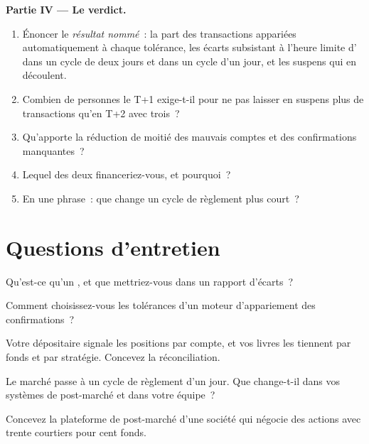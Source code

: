 \begin{problem}
\medskip\noindent\textbf{Partie IV --- Le verdict.}
\begin{enumerate}[resume]
\item Énoncer le \emph{résultat nommé}~: la part des transactions appariées automatiquement à chaque tolérance, les écarts subsistant à l'heure limite d'
dans un cycle de deux jours et dans un cycle d'un jour, et les suspens qui en découlent.
\item Combien de personnes le T+1 exige-t-il pour ne pas laisser en suspens plus de transactions qu'en T+2 avec trois~?
\item Qu'apporte la réduction de moitié des mauvais comptes et des confirmations manquantes~?
\item Lequel des deux financeriez-vous, et pourquoi~?
\item En une phrase~: que change un cycle de règlement plus court~?
\end{enumerate}
\end{problem}

\section{Questions d'entretien}

\begin{interviewq}\label{iq:pl:post-trade-systems:1}
Qu'est-ce qu'un , et que mettriez-vous dans un rapport d'écarts~?
\end{interviewq}

\begin{interviewq}\label{iq:pl:post-trade-systems:2}
Comment choisissez-vous les tolérances d'un moteur d'appariement des confirmations~?
\end{interviewq}

\begin{interviewq}\label{iq:pl:post-trade-systems:3}
Votre dépositaire signale les positions par compte, et vos livres les tiennent par fonds et par stratégie. Concevez la réconciliation.
\end{interviewq}

\begin{interviewq}\label{iq:pl:post-trade-systems:4}
Le marché passe à un cycle de règlement d'un jour. Que change-t-il dans vos systèmes de post-marché et dans votre équipe~?
\end{interviewq}

\begin{interviewq}\label{iq:pl:post-trade-systems:5}
Concevez la plateforme de post-marché d'une société qui négocie des actions avec trente courtiers pour cent fonds.
\end{interviewq}
